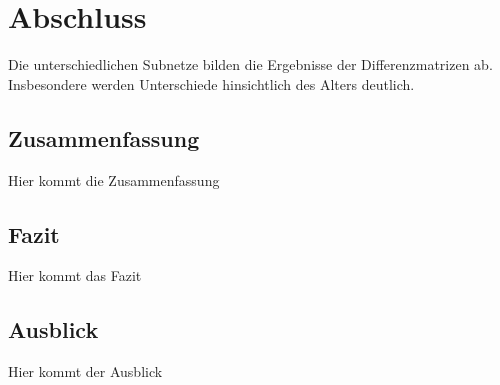 \chapter{Abschluss}

Die unterschiedlichen Subnetze bilden die Ergebnisse der Differenzmatrizen ab. Insbesondere werden Unterschiede hinsichtlich des Alters deutlich.

\section{Zusammenfassung}

Hier kommt die Zusammenfassung

\section{Fazit}

Hier kommt das Fazit

\section{Ausblick}

Hier kommt der Ausblick

